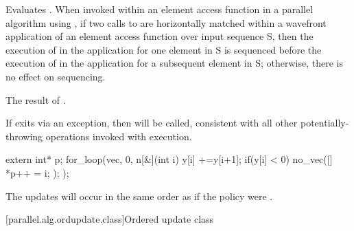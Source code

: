\begin{itemdescr}
\pnum \effects Evaluates . When invoked within an element access function in a parallel algorithm using , if two calls to  are horizontally matched within a wavefront application of an element access function over input sequence S, then the execution of  in the application for one element in S is sequenced before the execution of  in the application for a subsequent element in S; otherwise, there is no effect on sequencing.

\pnum \returns The result of .

\pnum \realnotes If  exits via an exception, then  will be called, consistent with all other potentially-throwing operations invoked with  execution.

\begin{example}
\begin{codeblock}
extern int* p;
for_loop(vec, 0, n[&](int i) {
  y[i] +=y[i+1];
  if(y[i] < 0) {
    no_vec([]{
      *p++ = i;
    });
  }
});
\end{codeblock}

The updates  will occur in the same order as if the policy were .
\end{example}

\end{itemdescr}

[parallel.alg.ordupdate.class]{Ordered update class}

